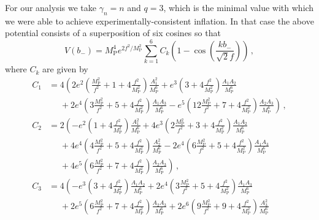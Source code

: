 \documentclass[11pt]{article}
\begin{document}
For our analysis we take $\gamma_n = n$ and $q = 3$, which is the minimal value with which we were able to achieve experimentally-consistent inflation.
In that case the above potential consists of a superposition of six cosines so that
\begin{equation} \label{eq:supergravity:Vslow3}
  V\left(b_-\right)
    = M_\text{P}^4 e^{2 f^2 / M_\text{P}^2} \sum_{k = 1}^6 C_k \left(1 - \cos\left(\frac{k b_-}{\sqrt{2} f}\right)\right)\,,
\end{equation}
where $C_k$ are given by
\begin{equation} \label{eq:supergravity:Vslow3Coefficients}
  \begin{aligned}
    C_1 &=   4 \left(
        2 e^2 \left(   \frac{M_\text{P}^2}{f^2} + 1 + 4 \frac{f^2}{M_\text{P}^2}\right) \frac{A_1^2  }{M_\text{P}^6}
      +   e^3 \left(                              3 + 4 \frac{f^2}{M_\text{P}^2}\right) \frac{A_1 A_2}{M_\text{P}^6}\right.\\
      &~~~~~~ \left.{}
      + 2 e^4 \left( 3 \frac{M_\text{P}^2}{f^2} + 5 + 4 \frac{f^2}{M_\text{P}^2}\right) \frac{A_1 A_3}{M_\text{P}^6}
      -   e^5 \left(12 \frac{M_\text{P}^2}{f^2} + 7 + 4 \frac{f^2}{M_\text{P}^2}\right) \frac{A_2 A_3}{M_\text{P}^6}
    \right)\,,\\
    C_2 &=   2 \left(
      -   e^2 \left(                              1 + 4 \frac{f^2}{M_\text{P}^2}\right) \frac{A_1^2  }{M_\text{P}^6}
      + 4 e^3 \left( 2 \frac{M_\text{P}^2}{f^2} + 3 + 4 \frac{f^2}{M_\text{P}^2}\right) \frac{A_1 A_2}{M_\text{P}^6}\right.\\
      &~~~~~~ \left.{}
      + 4 e^4 \left( 4 \frac{M_\text{P}^2}{f^2} + 5 + 4 \frac{f^2}{M_\text{P}^2}\right) \frac{A_2^2  }{M_\text{P}^6}
      - 2 e^4 \left( 6 \frac{M_\text{P}^2}{f^2} + 5 + 4 \frac{f^2}{M_\text{P}^2}\right) \frac{A_1 A_3}{M_\text{P}^6}\right.\\
      &~~~~~~ \left.{}
      + 4 e^5 \left( 6 \frac{M_\text{P}^2}{f^2} + 7 + 4 \frac{f^2}{M_\text{P}^2}\right) \frac{A_2 A_3}{M_\text{P}^6}
    \right)\,,\\
    C_3 &=   4 \left(
      -   e^3 \left(                              3 + 4 \frac{f^2}{M_\text{P}^2}\right) \frac{A_1 A_2}{M_\text{P}^6}
      + 2 e^4 \left( 3 \frac{M_\text{P}^2}{f^2} + 5 + 4 \frac{f^2}{M_\text{P}^2}\right) \frac{A_1 A_3}{M_\text{P}^6}\right.\\
      &~~~~~~ \left.{}
      + 2 e^5 \left( 6 \frac{M_\text{P}^2}{f^2} + 7 + 4 \frac{f^2}{M_\text{P}^2}\right) \frac{A_2 A_3}{M_\text{P}^6}
      + 2 e^6 \left( 9 \frac{M_\text{P}^2}{f^2} + 9 + 4 \frac{f^2}{M_\text{P}^2}\right) \frac{A_3^2  }{M_\text{P}^6}

\end{aligned}
\end{equation}
\end{document}
